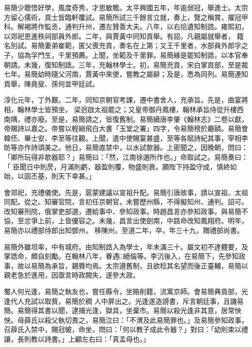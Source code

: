 \begin{pinyinscope}
 易簡少聰悟好學，風度奇秀，才思敏贍。太平興國五年，年逾弱冠，舉進士。太宗方留心儒術，貢士皆臨軒覆試。易簡所試三千餘言立就，奏上，覽之稱賞，擢冠甲科。解褐將作監丞，通判升州，遷左贊善大夫。八年，以右拾遺知制誥。雍熙初，以郊祀恩進秩祠部員外郎。二年，與賈黃中同知貢舉。有詔，凡親屬就舉者，
 籍名別試。易簡妻弟崔範，匿父喪充貢，奏名在上第；又王千里者，水部員外郎孚之子，協為孚門生，千里預薦。上聞，坐範及千里罪。易簡緣是罷知制誥，以本官奉朝請。未幾，復知制誥。三年，充翰林學士。初，易簡充貢，宋白掌貢部，至是裁七年。易簡幼時隨父河南，賈黃中來使，嘗教之屬辭；及是，悉為同列。易簡連知貢舉，陳堯叟、孫何並甲廷試。



 淳化元年，丁外艱。二年，同知京朝官考課，遷中書舍人，充承旨。先是，曲宴將相，翰林學士皆預坐，
 梁迥啟太祖罷之；又皇帝御丹鳳樓，翰林承旨侍從升樓西南隅，禮亦廢。至是，易簡請之，皆復舊制。易簡續唐李肇《翰林志》二卷以獻，帝賜詩以嘉之。帝嘗以輕綃飛白大書「玉堂之署」四字，令易簡榜於廳額。易簡會韓伾、畢士安、李至等往觀。上聞，遣中使賜宴甚盛，至等各賦詩紀其事，宰相李昉等亦作詩頌美之。他日，易簡直禁中，以水試欹器。上密聞之，因晚朝，問曰：「卿所玩得非欹器耶？」易簡曰：「然，江南徐邈所作也。」命取試之。易簡奏曰：「
 臣聞日中則昃，月滿則虧，器盈則覆，物盛則衰。願陛下持盈守成，慎終如始，以固丕基，則天下幸甚。」



 會郊祀，充禮儀使。先是，扈蒙建議以宣祖升配。易簡引唐故事，請以宣祖、太祖同配。從之。知審官院，言初任京朝官，未嘗歷州縣，不得擬知州、通判。詔可。改知審刑院，俄掌吏部選，遷給事中、參知政事。時趙昌言亦參知政事，與易簡不協，至忿爭上前，上皆優容之。未幾，昌言出使劍南，中路命改知鳳翔府。明年，易簡亦以禮部侍郎出知鄧州，
 移陳州。至道二年，卒，年三十九，贈禮部尚書。



 易簡外雖坦率，中有城府。由知制誥入為學士，年未滿三十。屬文初不達體要，及掌誥命，頗自刻勵。在翰林八年，眷遇□絕倫等。李沆後入，在易簡下，先參知政事，故以易簡為承旨，錫賚均焉。太宗遵舊制，且欲稔其名望而後正臺輔，易簡以親老急於進用，因亟言時政闕失，遂參大政。



 蜀人何光逢，易簡之執友也，嘗任縣令，坐賂削籍，流寓京師。會易簡典貢部，光逢代人充試以取貲，易簡於稠
 人中屏出之。光逢遂造謗書，斥言朝廷事，且譏易簡。易簡得其書以聞，逮捕光逢，獄具，坐棄市。易簡以殺光逢非其意，居常怏怏。母薛氏以殺父執切責之，易簡泣曰：「不渭及此易簡罪也。」及易簡參知政事，召薛氏入禁中，賜冠帔，命坐，問曰：「何以教子成此令器？」對曰：「幼則束以禮讓，長則教以詩書。」上顧左右曰：「真孟母也。」




\end{pinyinscope}

